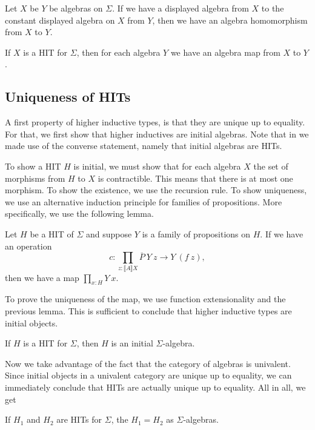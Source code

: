 \documentclass[9pt]{entcs}
\newcommand{\deprod}[3]{\prod_{#1 : #2} #3} %
\newcommand{\0}{\textbf{0}} %
\newcommand{\1}{\textbf{1}} %
\newcommand{\semP}[1]{\llbracket #1 \rrbracket} %
\newcommand{\polydact}[2]{\overline{#1} \> #2} %
\begin{document}
\begin{proposition}
Let $X$ be $Y$ be algebras on $\Sigma$.
If we have a displayed algebra from $X$ to the constant displayed algebra on $X$ from $Y$, then we have an algebra homomorphism from $X$ to $Y$.
\end{proposition}

\begin{corollary}
If $X$ is a HIT for $\Sigma$, then for each algebra $Y$ we have an algebra map from $X$ to $Y$.
\end{corollary}

\subsection{Uniqueness of HITs}
A first property of higher inductive types, is that they are unique up to equality.
For that, we first show that higher inductives are initial algebras.
Note that in  we made use of the converse statement, namely that initial algebras are HITs.

To show a HIT $H$ is initial, we must show that for each algebra $X$ the set of morphisms from $H$ to $X$ is contractible.
This means that there is at most one morphism.
To show the existence, we use the recursion rule.
To show uniqueness, we use an alternative induction principle for families of propositions.
More specifically, we use the following lemma.

\begin{lemma}
Let $H$ be a HIT of $\Sigma$ and suppose $Y$ is a family of propositions on $H$.
If we have an operation
\[
c : \deprod{z}{\semP{A}{X}}{\polydact{P}{Y} \> z \rightarrow Y \> (f \> z)},
\]
then we have a map $\deprod{x}{H}{Y \> x}$.
\end{lemma}

To prove the uniqueness of the map, we use function extensionality and the previous lemma.
This is sufficient to conclude that higher inductive types are initial objects.

\begin{proposition}
If $H$ is a HIT for $\Sigma$, then $H$ is an initial $\Sigma$-algebra.
\end{proposition}

Now we take advantage of the fact that the category of algebras is univalent.
Since initial objects in a univalent category are unique up to equality, we can immediately conclude that HITs are actually unique up to equality.
All in all, we get

\begin{theorem}
If $H_1$ and $H_2$ are HITs for $\Sigma$, the $H_1 = H_2$ as $\Sigma$-algebras.
\end{theorem}
\end{document}
